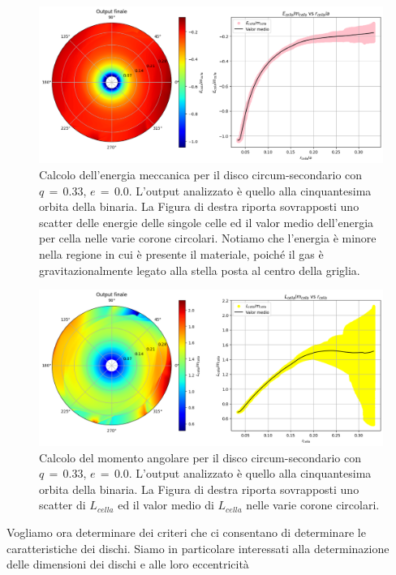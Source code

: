 \begin{figure}[H]
    \centering
    \includegraphics[width=\textwidth]{Immagini/Simulazioni/cal_ene.png}
    \caption{Calcolo dell'energia meccanica per il disco circum-secondario con $q\,=\,0.33$, $e\,=\,0.0$. L'output analizzato è quello alla cinquantesima orbita della binaria. La Figura di destra riporta sovrapposti uno scatter delle energie delle singole celle ed il valor medio dell'energia per cella nelle varie corone circolari. Notiamo che l'energia è minore nella regione in cui è presente il materiale, poiché il gas è gravitazionalmente legato alla stella posta al centro della griglia.}
    \label{fig:ene_grid}
\end{figure}

\begin{figure}[H]
    \centering
    \includegraphics[width=\textwidth]{Immagini/Simulazioni/cal_moma.png}
    \caption{Calcolo del momento angolare per il disco circum-secondario con $q\,=\,0.33$, $e\,=\,0.0$. L'output analizzato è quello alla cinquantesima orbita della binaria. La Figura di destra riporta sovrapposti uno scatter di $L_{cella}$ ed il valor medio di $L_{cella}$ nelle varie corone circolari.}
    \label{fig:moma_grid}
\end{figure}

\newpage

Vogliamo ora determinare dei criteri che ci consentano di determinare le caratteristiche dei dischi. Siamo in particolare interessati alla determinazione delle dimensioni dei dischi e alle loro eccentricità

